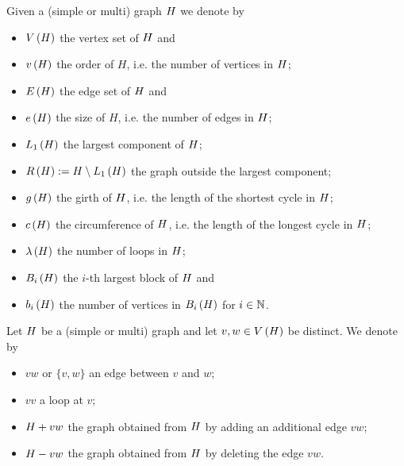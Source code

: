\begin{definition}
Given a (simple or multi) graph $H$ we denote by
	\begin{itemize}
		\item 
		$V\left(H\right)$ the vertex set of $H$ and \item[] 
		$v\left({H}\right)$ the order of $H$, i.e. the number of vertices in $H$;
		\item 
		$E\left(H\right)$ the edge set of $H$ and
		\item[] 
		$e\left({H}\right)$ the size of $H$, i.e. the number of edges in $H$;	
		\item 
		$L_1\left(H\right)$ the largest component of $H$;
		\item
		$R\left(H\right):=H \setminus L_1\left(H\right)$ the graph outside the largest component;
		\item 
		$g\left({H}\right)$ the girth of $H$, i.e. the length of the shortest cycle in $H$;
		\item
		$c\left({H}\right)$ the circumference of $H$, i.e. the length of the longest cycle in $H$;
		\item 
		$\lambda\left(H\right)$ the number of loops in $H$;
		\item $B_{i}\left(H\right)$ the $i$-th largest block of $H$ and
			\item[] 
		$b_{i}\left(H\right)$ the number of vertices in $B_{i}\left(H\right)$ for $i \in \mathbb{N}$.
	\end{itemize}
\end{definition}

\begin{definition}
Let $H$ be a (simple or multi) graph and let $v, w \in V\left(H\right)$ be distinct. We denote by
\begin{itemize}
\item
$vw$ or $\{v,w\}$ an edge between $v$ and $w$;
\item
$vv$ a loop at $v$;
\item
$H+vw$ the graph obtained from $H$ by adding an additional edge $vw$;
\item
$H-vw$ the graph obtained from $H$ by deleting the edge $vw$.
\end{itemize}
\end{definition}

